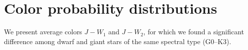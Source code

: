 \chapter{Color probability distributions}\label{Appendix:3}
We present average colors $J-W_{1}$ and $J-W_{2}$, for which we found a significant difference among dwarf and giant stars of the same spectral type (G0--K3). 
